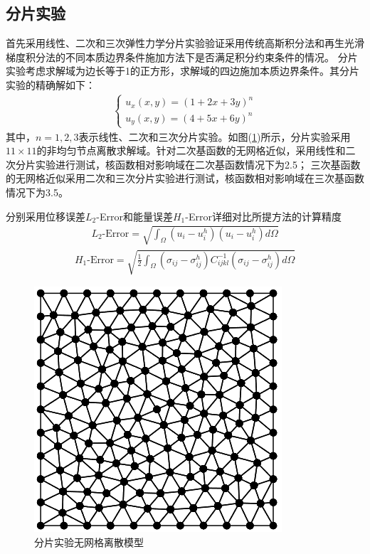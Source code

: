 \subsection{分片实验}
首先采用线性、二次和三次弹性力学分片实验验证采用传统高斯积分法和再生光滑梯度积分法的不同本质边界条件施加方法下是否满足积分约束条件的情况。
分片实验考虑求解域为边长等于1的正方形，求解域的四边施加本质边界条件。其分片实验的精确解如下：
\begin{equation}
\begin{split}
    \begin{cases}
        u_x(x,y)=(1+2x+3y)^n\\
        u_y(x,y)=(4+5x+6y)^n
    \end{cases}
\end{split}
\end{equation}
其中，$n=1,2,3$表示线性、二次和三次分片实验。如图(\ref{patchtestmeshfree})所示，分片实验采用$11\times 11$的非均匀节点离散求解域。针对二次基函数的无网格近似，采用线性和二次分片实验进行测试，核函数相对影响域在二次基函数情况下为2.5；
三次基函数的无网格近似采用二次和三次分片实验进行测试，核函数相对影响域在三次基函数情况下为3.5。\par
分别采用位移误差$L_2$-Error和能量误差$H_1$-Error详细对比所提方法的计算精度
\begin{equation}
\begin{split}
    L_2\text{-Error}=\sqrt{\int_{\Omega}(u_i-u_i^h)(u_i-u_i^h)d\Omega}
\end{split}
\end{equation}
\begin{equation}
    \begin{split}
        H_1\text{-Error}=\sqrt{\frac{1}{2}\int_{\Omega}(\sigma_{ij}-\sigma_{ij}^h)C_{ijkl}^{-1}(\sigma_{ij}-\sigma_{ij}^h)d\Omega}
    \end{split}
    \end{equation}\par
\begin{figure}[H]
    \centering
    \includegraphics[scale=0.7]{figure/EHR/patchtestmeshfree.png}
    \caption{分片实验无网格离散模型}\label{patchtestmeshfree}
\end{figure} 
